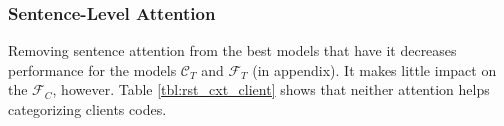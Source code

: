 \subsubsection{Sentence-Level Attention}
\label{sssec:snt:snt-att-analysis}
Removing sentence attention from the best models that have it
decreases performance for the models $\mathcal{C}_T$ and
$\mathcal{F}_T$ (in appendix).
%
%
  It makes little impact
on the $\mathcal{F}_C$, however.
%
Table \ref{tbl:rst_cxt_client} shows that neither attention helps
categorizing clients codes.
%

